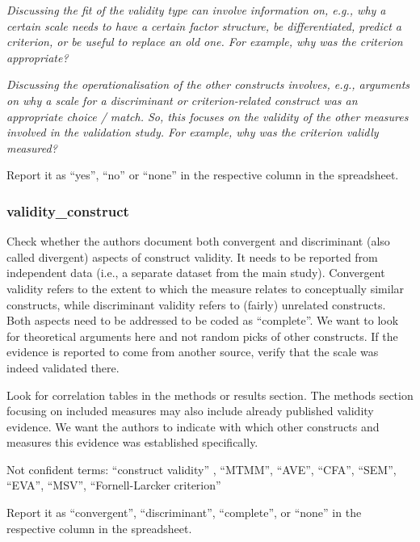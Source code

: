 {\textit{Discussing the fit of the validity type can involve information on, e.g., why a certain scale needs to have a certain factor structure, be differentiated, predict a criterion, or be useful to replace an old one. For example, why was the criterion appropriate?}

\textit{Discussing the operationalisation of the other constructs involves, e.g., arguments on why a scale for a discriminant or criterion-related construct was an appropriate choice / match. So, this focuses on the validity of the other measures involved in the validation study. For example, why was the criterion validly measured?}

Report it as ``yes'', ``no'' or ``none'' in the respective column in the spreadsheet.

\subsubsection*{validity\_construct}
\label{validconstruct}
Check whether the authors document both convergent and discriminant (also called divergent) aspects of construct validity. It needs to be reported from independent data (i.e., a separate dataset from the main study). Convergent validity refers to the extent to which the measure relates to conceptually similar constructs, while discriminant validity refers to (fairly) unrelated constructs. Both aspects need to be addressed to be coded as ``complete''. We want to look for theoretical arguments here and not random picks of other constructs. If the evidence is reported to come from another source, verify that the scale was indeed validated there.

Look for correlation tables in the methods or results section. The methods section focusing on included measures may also include already published validity evidence. We want the authors to indicate with which other constructs and measures this evidence was established specifically.

Not confident terms: ``construct validity'' , ``MTMM'', ``AVE'', ``CFA'', ``SEM'', ``EVA'', ``MSV'', ``Fornell-Larcker criterion''

Report it as ``convergent'', ``discriminant'', ``complete'', or ``none'' in the respective column in the spreadsheet.


}
